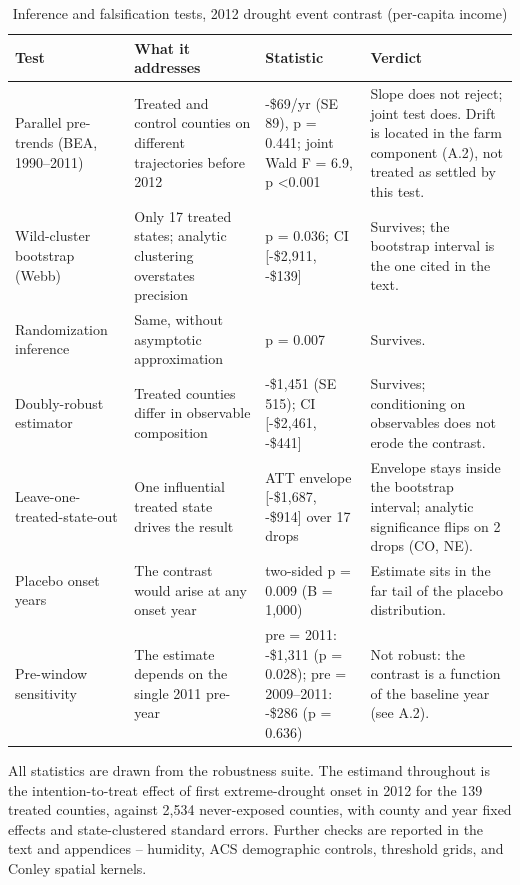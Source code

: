 \begin{table}[htbp]
\centering
\footnotesize
\setlength{\tabcolsep}{4pt}
\sloppy
\caption{Inference and falsification tests, 2012 drought event contrast (per-capita income)}
\label{tab:e1t4}
\begin{tabularx}{\textwidth}{>{\raggedright\arraybackslash}p{3.1cm} >{\raggedright\arraybackslash}X >{\raggedright\arraybackslash}p{4.2cm} >{\raggedright\arraybackslash}p{3.4cm}}
\toprule
Test & What it addresses & Statistic & Verdict \\
\midrule
Parallel pre-trends (BEA, 1990--2011) & Treated and control counties on different trajectories before 2012 & -\$69/yr (SE 89), p = 0.441; joint Wald F = 6.9, p \textless{}0.001 & Slope does not reject; joint test does. Drift is located in the farm component (A.2), not treated as settled by this test. \\
Wild-cluster bootstrap (Webb) & Only 17 treated states; analytic clustering overstates precision & p = 0.036; CI [-\$2,911, -\$139] & Survives; the bootstrap interval is the one cited in the text. \\
Randomization inference & Same, without asymptotic approximation & p = 0.007 & Survives. \\
Doubly-robust estimator & Treated counties differ in observable composition & -\$1,451 (SE 515); CI [-\$2,461, -\$441] & Survives; conditioning on observables does not erode the contrast. \\
Leave-one-treated-state-out & One influential treated state drives the result & ATT envelope [-\$1,687, -\$914] over 17 drops & Envelope stays inside the bootstrap interval; analytic significance flips on 2 drops (CO, NE). \\
Placebo onset years & The contrast would arise at any onset year & two-sided p = 0.009 (B = 1,000) & Estimate sits in the far tail of the placebo distribution. \\
Pre-window sensitivity & The estimate depends on the single 2011 pre-year & pre = 2011: -\$1,311 (p = 0.028); pre = 2009--2011: -\$286 (p = 0.636) & Not robust: the contrast is a function of the baseline year (see A.2). \\
\bottomrule
\end{tabularx}
\begin{minipage}{\textwidth}\vspace{0.5em}\footnotesize
All statistics are drawn from the robustness suite. The estimand throughout is the intention-to-treat effect of first extreme-drought onset in 2012 for the 139 treated counties, against 2,534 never-exposed counties, with county and year fixed effects and state-clustered standard errors. Further checks are reported in the text and appendices -- humidity, ACS demographic controls, threshold grids, and Conley spatial kernels. 
\end{minipage}
\end{table}
